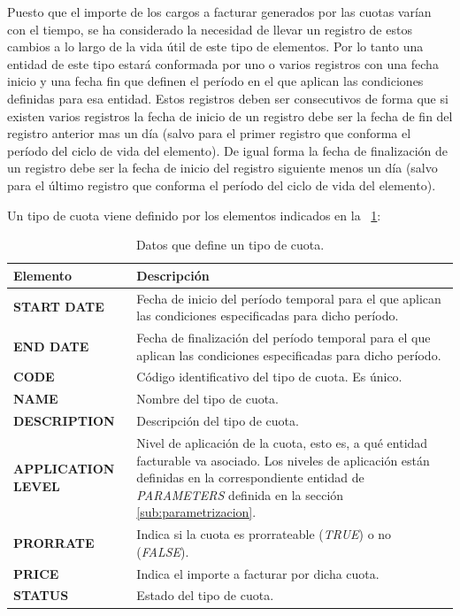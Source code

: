 Puesto que el importe de los cargos a facturar generados por las cuotas varían con el tiempo, se ha considerado la necesidad de llevar un registro de estos cambios a lo largo de la vida útil de este tipo de elementos. Por lo tanto una entidad de este tipo estará conformada por uno o varios registros con una fecha inicio y una fecha fin que definen el período en el que aplican las condiciones definidas para esa entidad. Estos registros deben ser consecutivos de forma que si existen varios registros la fecha de inicio de un registro debe ser la fecha de fin del registro anterior mas un día (salvo para el primer registro que conforma el período del ciclo de vida del elemento). De igual forma la fecha de finalización de un registro debe ser la fecha de inicio del registro siguiente menos un día (salvo para el último registro que conforma el período del ciclo de vida del elemento).


Un tipo de cuota viene definido por los elementos indicados en la \tablename~\ref{tab:tipo-cuota}:




\begin{table}[H]
  \centering
  \setlength{\leftmargini}{0.4cm}
  \resizebox{14cm}{!} {
  \begin{tabular}{|m{3cm} m{11cm}|}
  \rowcolor{udcpink!25}
  \hline
  	\textbf{Elemento} & \textbf{Descripción} \\\hline
  	\textbf{START DATE} & Fecha de inicio del período temporal para el que aplican las condiciones especificadas para dicho período.\\
  	\textbf{END DATE} & Fecha de finalización del período temporal para el que aplican las condiciones especificadas para dicho período.\\
  	\textbf{CODE} & Código identificativo del tipo de cuota. Es único.\\
	\textbf{NAME} & Nombre del tipo de cuota.\\
	\textbf{DESCRIPTION} & Descripción del tipo de cuota.\\
	\textbf{APPLICATION LEVEL} & Nivel de aplicación de la cuota, esto es, a qué entidad facturable va asociado. Los niveles de aplicación están definidas en la correspondiente entidad de \emph{PARAMETERS} definida en la sección \ref{sub:parametrizacion}.\\	
	\textbf{PRORRATE} & Indica si la cuota es prorrateable (\textit{TRUE}) o no (\textit{FALSE}).\\
	\textbf{PRICE} & Indica el importe a facturar por dicha cuota.\\
	\textbf{STATUS} & Estado del tipo de cuota.	
	\\\hline
  \end{tabular}
  } %
  \caption{Datos que define un tipo de cuota.}
  \label{tab:tipo-cuota}
\end{table}



